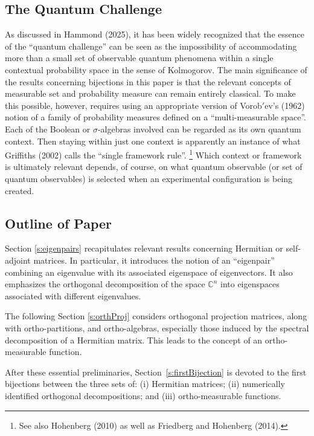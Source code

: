 \documentclass[11pt]{article}
\newcommand \C { \mathbb{C} }
\begin{document}
\subsection{The Quantum Challenge}

As discussed in Hammond (2025), it has been widely recognized 
that the essence of the ``quantum challenge'' can be seen 
as the impossibility of accommodating more than a small set of observable quantum phenomena
within a single contextual probability space in the sense of Kolmogorov.
The main significance of the results concerning bijections in this paper
is that the relevant concepts of measurable set and probability measure 
can remain entirely classical.
To make this possible, however, requires using an appropriate version
of Vorob$'$ev's (1962) notion of a family of probability measures 
defined on a ``multi-measurable space''.
Each of the Boolean or $ \sigma $-algebras involved can be regarded as its own quantum context.
Then staying within just one context is apparently an instance 
of what Griffiths (2002) calls the ``single framework rule''.%
%
\footnote{See also Hohenberg (2010) as well as Friedberg and Hohenberg (2014).}
%
Which context or framework is ultimately relevant depends, of course, 
on what quantum observable (or set of quantum observables) is selected
when an experimental configuration is being created. 

\subsection{Outline of Paper}

Section \ref{s:eigenpairs} recapitulates relevant results 
concerning Hermitian or self-adjoint matrices.
In particular, it introduces the notion of an ``eigenpair'' 
combining an eigenvalue with its associated eigenspace of eigenvectors.
It also emphasizes the orthogonal decomposition of the space $ \C^n $ 
into eigenspaces associated with different eigenvalues.

The following Section \ref{s:orthProj} considers orthogonal projection matrices,
along with ortho-partitions, and ortho-algebras, 
especially those induced by the spectral decomposition of a Hermitian matrix.
This leads to the concept of an ortho-measurable function.

After these essential preliminaries, Section~\ref{s:firstBijection} is devoted 
to the first bijections between the three sets of: (i) Hermitian matrices; 
(ii) numerically identified orthogonal decompositions; 
and (iii) ortho-measurable functions. 
\end{document}

